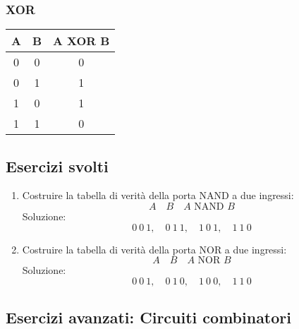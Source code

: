 \documentclass[12pt,a4paper]{article}
\begin{document}
\subsubsection{XOR}
\begin{tabular}{c c | c}
A & B & A XOR B \\
\hline
0 & 0 & 0 \\
0 & 1 & 1 \\
1 & 0 & 1 \\
1 & 1 & 0 \\
\end{tabular}

\subsection{Esercizi svolti}

\begin{enumerate}
    \item Costruire la tabella di verità della porta NAND a due ingressi:
    \[
    A\quad B\quad A\text{ NAND }B
    \]
    Soluzione:
    \[
    0\ 0\ 1, \quad 0\ 1\ 1, \quad 1\ 0\ 1, \quad 1\ 1\ 0
    \]

    \item Costruire la tabella di verità della porta NOR a due ingressi:
    \[
    A\quad B\quad A\text{ NOR }B
    \]
    Soluzione:
    \[
    0\ 0\ 1, \quad 0\ 1\ 0, \quad 1\ 0\ 0, \quad 1\ 1\ 0
    \]
\end{enumerate}

\subsection{Esercizi avanzati: Circuiti combinatori}
\end{document}
